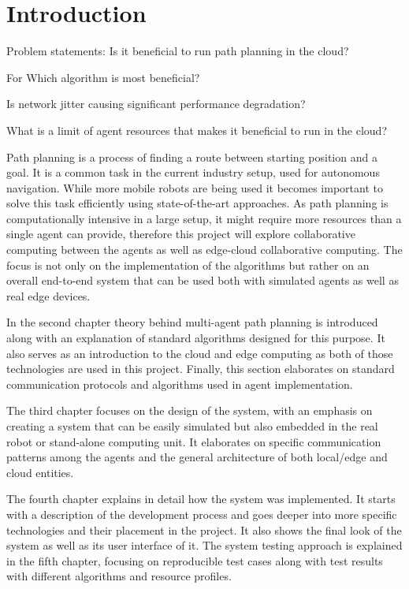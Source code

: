 \chapter{Introduction}
Problem statements:
Is it beneficial to run path planning in the cloud?

For Which algorithm is most beneficial?

Is network jitter causing significant performance degradation?

What is a limit of agent resources that makes it beneficial to run in the cloud?

Path planning is a process of finding a route between starting position and a goal. It is a common task in the current industry setup, used for autonomous navigation. While more mobile robots are being used it becomes important to solve this task efficiently using state-of-the-art approaches. As path planning is computationally intensive in a large setup, it might require more resources than a single agent can provide, therefore this project will explore collaborative computing between the agents as well as edge-cloud collaborative computing. The focus is not only on the implementation of the algorithms but rather on an overall end-to-end system that can be used both with simulated agents as well as real edge devices.

In the second chapter theory behind multi-agent path planning is introduced along with an explanation of standard algorithms designed for this purpose. It also serves as an introduction to the cloud and edge computing as both of those technologies are used in this project. Finally, this section elaborates on standard communication protocols and algorithms used in agent implementation.

The third chapter focuses on the design of the system, with an emphasis on creating a system that can be easily simulated but also embedded in the real robot or stand-alone computing unit. It elaborates on specific communication patterns among the agents and the general architecture of both local/edge and cloud entities.

The fourth chapter explains in detail how the system was implemented. It starts with a description of the development process and goes deeper into more specific technologies and their placement in the project. It also shows the final look of the system as well as its user interface of it. The system testing approach is explained in the fifth chapter, focusing on reproducible test cases along with test results with different algorithms and resource profiles.

